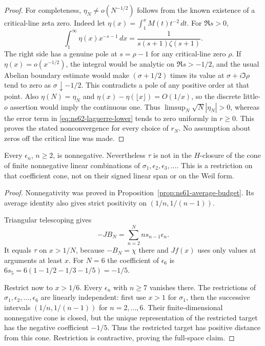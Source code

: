 \begin{proof}
For completeness, $\eta_N\ne o(N^{-1/2})$ follows from the known
existence of a critical-line zeta zero. Indeed let
$\eta(x)=\int_1^xM(t)t^{-2}\,dt$. For $\Re s>0$,
\[
 \int_1^\infty\eta(x)x^{-s-1}\,dx
        =\frac1{s(s+1)\zeta(s+1)}.
\]
The right side has a genuine pole at $s=\rho-1$ for any
critical-line zero $\rho$. If $\eta(x)=o(x^{-1/2})$, the integral
would be analytic on $\Re s>-1/2$, and the usual Abelian boundary
estimate would make $(\sigma+1/2)$ times its value at
$\sigma+i\Im\rho$ tend to zero as $\sigma\downarrow-1/2$.
This contradicts a pole of any positive order at that point.
Also $\eta(N)=\eta_N$ and
$\eta(x)-\eta(\lfloor x\rfloor)=O(1/x)$, so the discrete
little-$o$ assertion would imply the continuous one. Thus
$\limsup_N\sqrt N|\eta_N|>0$, whereas the error term in
\eqref{eq:ns62-laguerre-lower} tends to zero uniformly in $r\geq0$.
This proves the stated nonconvergence for every choice of $r_N$.
No assumption about zeros off the critical line was made.
\end{proof}

\begin{proposition}
\label{prop:ns62-positive-cone}
Every $\epsilon_n$, $n\geq2$, is nonnegative. Nevertheless $\tau$
is not in the $H$-closure of the cone of finite nonnegative linear
combinations of $\sigma_1,\epsilon_2,\epsilon_3,\ldots$.
This is a restriction on that coefficient cone, not on their signed
linear span or on the Weil form.
\end{proposition}
\begin{proof}
Nonnegativity was proved in Proposition~\ref{prop:ns61-average-budget}.
Its average identity also gives strict positivity on
$(1/n,1/(n-1))$.

Triangular telescoping gives
\begin{equation}
 -JB_N=\sum_{n=2}^{N}n s_{n-1}\epsilon_n.
 \label{eq:ns62-pointwise-series}
\end{equation}
It equals $\tau$ on $x>1/N$, because $-B_N=\chi$ there and
$Jf(x)$ uses only values at arguments at least $x$.
For $N=6$ the coefficient of $\epsilon_6$ is
$6s_5=6(1-1/2-1/3-1/5)=-1/5$.

Restrict now to $x>1/6$. Every $\epsilon_n$ with $n\geq7$
vanishes there. The restrictions of
$\sigma_1,\epsilon_2,\ldots,\epsilon_6$ are linearly independent:
first use $x>1$ for $\sigma_1$, then the successive intervals
$(1/n,1/(n-1))$ for $n=2,\ldots,6$.
Their finite-dimensional nonnegative cone is closed, but the unique
representation of the restricted target has the negative coefficient
$-1/5$. Thus the restricted target has positive distance from this
cone. Restriction is contractive, proving the full-space claim.
\end{proof}

